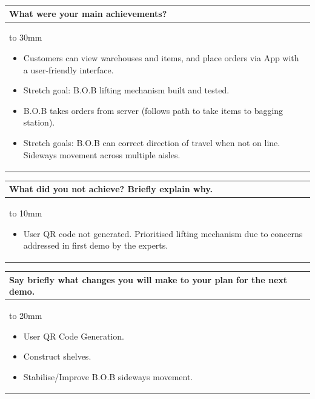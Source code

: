 \documentclass[a4paper]{article}
\newcommand{\colWidth}{141mm}
\begin{document}
\begin{center}

\begin{tabular}{|p{\colWidth}|}
	\hline
	\cellcolor{blue!25}\large
	\textbf{What were your main achievements?}
	\\ \hline
	\vtop to 30mm{
	\begin{itemize}
	    \item Customers can view warehouses and items, and place orders via App with a user-friendly interface.
	    \item Stretch goal: B.O.B lifting mechanism built and tested.
	    \item B.O.B takes orders from server (follows path to take items to bagging station).
	    \item Stretch goals: B.O.B can correct direction of travel when not on line. Sideways movement across multiple aisles.
	\end{itemize}
  }
  \\
  \hline
\end{tabular}
\vskip 5mm


\begin{tabular}{|p{\colWidth}|}
	\hline
	\cellcolor{blue!25}\large
	\textbf{What did you not achieve? Briefly explain why.}
	\\ \hline
	\vtop to 10mm{
	\begin{itemize}
	    \item User QR code not generated. Prioritised lifting mechanism due to concerns addressed in first demo by the experts.
	\end{itemize}
  }
  \\
  \hline
\end{tabular}
\vskip 5mm


\begin{tabular}{|p{\colWidth}|}
	\hline
	\cellcolor{blue!25}\large
	\textbf{Say briefly what changes you will make to your plan for the next demo.}
	\\ \hline
	\vtop to 20mm{
	\begin{itemize}
	    \item User QR Code Generation.
	    \item Construct shelves.
	    \item Stabilise/Improve B.O.B sideways movement.
	\end{itemize}
  }
  \\
  \hline
\end{tabular}


\end{center}
\end{document}
